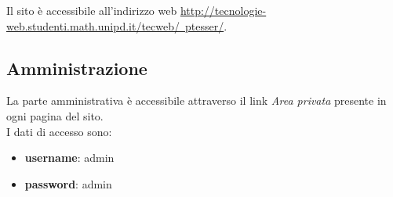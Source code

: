 Il sito \`e accessibile all'indirizzo web \href{http://tecnologie-web.studenti.math.unipd.it/tecweb/~ptesser/}{http://tecnologie-web.studenti.math.unipd.it/tecweb/~ptesser/}.

\subsection{Amministrazione}
La parte amministrativa \`e accessibile attraverso il link \textit{Area privata} presente in ogni pagina del sito. \\ I dati di accesso sono:
\begin{itemize}
	\item \textbf{username}: admin
	\item \textbf{password}: admin
\end{itemize}